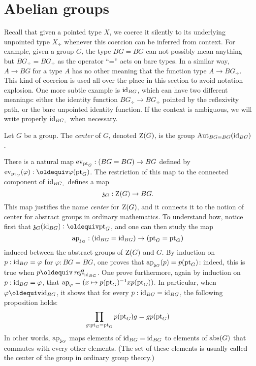 \section{Abelian groups}
\label{sec:abelian-groups}

Recall that given a pointed type $X$, we coerce it silently to its
underlying unpointed type $X_\div$ whenever this coercion can be
inferred from context. For example, given a group $G$, the type
$BG=BG$ can not possibly mean anything but $BG_\div=BG_\div$ as the
operator ``='' acts on bare types. In a similar way, $A\to BG$ for a
type $A$ has no other meaning that the function type $A \to
BG_\div$. This kind of coercion is used all over the place in this
section to avoid notation explosion. One more subtle example is
$\mathord{\mathrm{id}}_{BG}$, which can have two different meanings: either the identity
function $BG_\div \to BG_\div$ pointed by the reflexivity path, or the
bare unpointed identity function. If the context is ambiguous, we will
write properly $\id_{BG_\div}$ when necessary.

\begin{definition}
  Let $G$ be a group. The {\em center} of $G$, denoted
  $\operatorname{Z}(G)$, is the group
  $\operatorname{Aut}_{BG=BG}(\mathord{\mathrm{id}}_{BG})$.
\end{definition}

There is a natural map $\mathrm{ev}_{\mathrm{pt}_G} : (BG=BG) \to BG$
defined by $\ev_{\pt_G}(\varphi)\defequi \varphi(\pt_G)$. The
restriction of this map to the connected component of $\id_{BG_\div}$
defines a map
\begin{displaymath}
  \mathfrak z_{{G}} : \operatorname{Z}(G) \to BG.
\end{displaymath}
This map justifies the name {\em center} for $\operatorname{Z}(G)$, and it
connects it to the notion of center for abstract groups in ordinary
mathematics. To understand how, notice first that
$\grpcenterinc G (\id_{BG}) \defequi \pt_G$, and one can then study the
map
\begin{displaymath}
  \mathop{\mathrm{ap}_{\mathfrak z_{{G}}}}: (\mathord{\mathrm{id}}_{BG}=\mathord{\mathrm{id}}_{BG}) \to (\mathrm{pt}_G = \mathrm{pt}_G)
\end{displaymath}
induced between the abstract groups of $\operatorname{Z}(G)$ and $G$. By
induction on $p:\mathord{\mathrm{id}}_{BG} = \varphi$ for $\varphi:BG=BG$, one proves
that $\mathop{\mathrm{ap}_{\mathfrak z_{{G}}}}(p) = p(\mathrm{pt}_G)$: indeed, this is true when
$p\jdeq \refl {\id_{BG}}$. One prove furthermore, again by induction
on $p:\mathord{\mathrm{id}}_{BG} = \varphi$, that
$\mathop{\mathrm{ap}_{\varphi}} = (x\mapsto p(\mathrm{pt}_G)^{-1} x p(\mathrm{pt}_G))$. In particular,
when $\varphi \jdeq \id_{BG}$, it shows that for every
$p:\mathord{\mathrm{id}}_{BG}=\mathord{\mathrm{id}}_{BG}$, the following proposition holds:
\begin{displaymath}
  \prod_{g:\mathrm{pt}_G=\mathrm{pt}_G }p(\mathrm{pt}_G) g = g p(\mathrm{pt}_G)
\end{displaymath}
In other words, $\mathop{\mathrm{ap}_{\mathfrak z_{{G}}}}$ maps elements of
$\mathord{\mathrm{id}}_{BG}=\mathord{\mathrm{id}}_{BG}$ to elements of $\mathrm{abs}(G)$ that commutes with
every other elements. (The set of these elements is usually called the
center of the group in ordinary group theory.)


